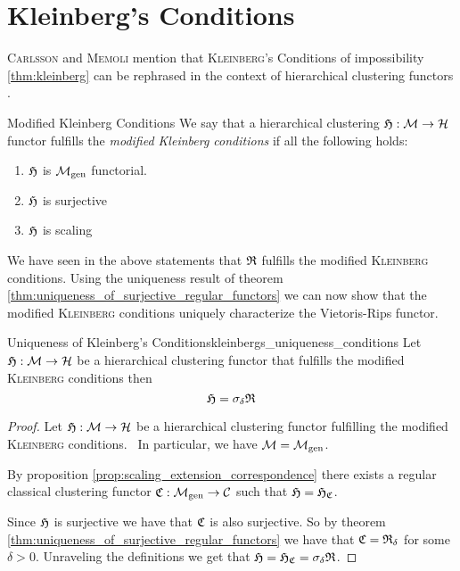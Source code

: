 \section{Kleinberg's Conditions}

\textsc{Carlsson} and \textsc{Memoli} mention that \textsc{Kleinberg}'s Conditions of impossibility \ref{thm:kleinberg} can be rephrased in the context of hierarchical clustering functors \cite[Sec.~7.3.1]{Carlsson2010}.

\begin{definition}{Modified Kleinberg Conditions \cite[Sec.~7.3.1]{Carlsson2010}}{}
    We say that a hierarchical clustering $\mathfrak{H}: \mathcal{M} \to \mathcal{H}$ functor fulfills the \emph{modified Kleinberg conditions} if all the following holds:
    \begin{enumerate}
        \item $\mathfrak{H}$ is ${\mathcal{M}_\mathrm{gen}}$ functorial.
        \item $\mathfrak{H}$ is surjective
        \item $\mathfrak{H}$ is scaling
    \end{enumerate}
\end{definition}

We have seen in the above statements that $\mathfrak{R}$ fulfills the modified \textsc{Kleinberg} conditions.
Using the uniqueness result of theorem \ref{thm:uniqueness_of_surjective_regular_functors} we can now show that the modified \textsc{Kleinberg} conditions uniquely characterize the Vietoris-Rips functor.

\begin{theorem}{Uniqueness of Kleinberg's Conditions}{kleinbergs_uniqueness_conditions}
    Let $\mathfrak{H}: \mathcal{M} \to \mathcal{H}$ be a hierarchical clustering functor that fulfills the modified \textsc{Kleinberg} conditions then
    $$
    \mathfrak{H} = \sigma_\delta \mathfrak{R}
    $$
\end{theorem}

\begin{proof}
Let $\mathfrak{H}: \mathcal{M} \to \mathcal{H}$ be a hierarchical clustering functor fulfilling the modified \textsc{Kleinberg} conditions. \Ie\ In particular, we have $\mathcal{M} = {\mathcal{M}_\mathrm{gen}}$.

By proposition \ref{prop:scaling_extension_correspondence} there exists a regular classical clustering functor $\mathfrak{C}: {\mathcal{M}_\mathrm{gen}} \to \mathcal{C}$ such that $\mathfrak{H} = \mathfrak{H}_{\mathfrak{C}}$.

Since $\mathfrak{H}$ is surjective we have that $\mathfrak{C}$ is also surjective. So by theorem \ref{thm:uniqueness_of_surjective_regular_functors} we have that $\mathfrak{C} = \mathfrak{R}_\delta$ for some $\delta > 0$. Unraveling the definitions we get that $\mathfrak{H} = \mathfrak{H}_{\mathfrak{C}} = \sigma_\delta \mathfrak{R}$.
\end{proof}
